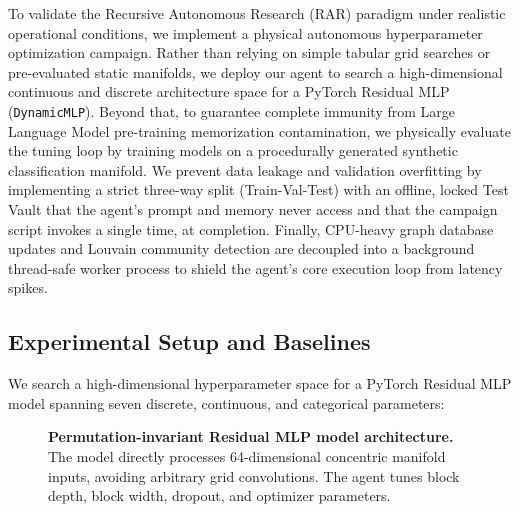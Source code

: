 \documentclass[conference]{IEEEtran}
\begin{document}
To validate the Recursive Autonomous Research (RAR) paradigm under realistic operational conditions, we implement a physical autonomous hyperparameter optimization campaign. Rather than relying on simple tabular grid searches or pre-evaluated static manifolds, we deploy our agent to search a high-dimensional continuous and discrete architecture space for a PyTorch Residual MLP (\texttt{DynamicMLP}). Beyond that, to guarantee complete immunity from Large Language Model pre-training memorization contamination, we physically evaluate the tuning loop by training models on a procedurally generated synthetic classification manifold. We prevent data leakage and validation overfitting by implementing a strict three-way split (Train-Val-Test) with an offline, locked Test Vault that the agent's prompt and memory never access and that the campaign script invokes a single time, at completion. Finally, CPU-heavy graph database updates and Louvain community detection are decoupled into a background thread-safe worker process to shield the agent's core execution loop from latency spikes.

\subsection{Experimental Setup and Baselines}
\label{sec:setup_pilot}

We search a high-dimensional hyperparameter space for a PyTorch Residual MLP model spanning seven discrete, continuous, and categorical parameters:
\begin{figure}[!t]
    \centering
    \caption{\textbf{Permutation-invariant Residual MLP model architecture.} The model directly processes 64-dimensional concentric manifold inputs, avoiding arbitrary grid convolutions. The agent tunes block depth, block width, dropout, and optimizer parameters.}
    \label{fig:mlp_arch}
\end{figure}
\end{document}
